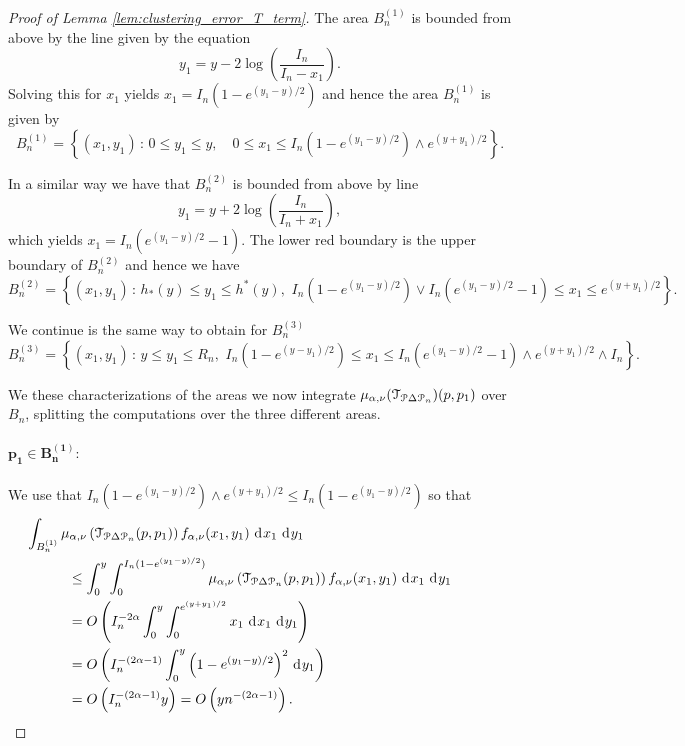 \begin{proof}[Proof of Lemma \ref{lem:clustering_error_T_term}]
The area $B_n^{(1)}$ is bounded from above by the line given by the equation
\[
	y_1 = y - 2\log\left(\frac{I_n}{I_n - x_1}\right).
\]
Solving this for $x_1$ yields $x_1 = I_n\left(1 - e^{(y_1-y)/2}\right)$ and hence the area $B_n^{(1)}$ is given by
\[
	B_n^{(1)} = \left\{(x_1, y_1) \, : \, 0 \le y_1 \le y, \quad 0 \le x_1 \le I_n\left(1 - e^{(y_1-y)/2}\right) \wedge e^{(y + y_1)/2} \right\}.
\]

In a similar way we have that $B_n^{(2)}$ is bounded from above by line
\[
	y_1 = y + 2\log\left(\frac{I_n}{I_n + x_1}\right),
\]
which yields $x_1 = I_n\left(e^{(y_1 - y)/2} - 1\right)$. The lower red boundary is the upper boundary of $B_n^{(2)}$ and hence we have
\[
	B_n^{(2)} = \left\{(x_1, y_1) \, : \, h_\ast(y) \le y_1 \le h^\ast(y), \,\, I_n\left(1 - e^{(y_1-y)/2}\right) \vee 
	I_n\left(e^{(y_1 - y)/2} - 1\right) \le x_1 \le e^{(y + y_1)/2} \right\}.
\]

We continue is the same way to obtain for $B_n^{(3)}$
\[
	B_n^{(3)} = \left\{(x_1, y_1) \, : \, y \le y_1 \le R_n, \,\,
	I_n\left(1 - e^{(y - y_1)/2}\right) \le x_1 \le I_n\left(e^{(y_1 - y)/2} - 1\right) \wedge e^{(y + y_1)/2} \wedge I_n \right\}.
\]

We these characterizations of the areas we now integrate $\mu_{\alpha, \nu}(\mathcal{T}_{{\mathcal P} \Delta {\mathcal P}_n})(p,p_1)$ over $B_n$, splitting the computations over the three different areas.

\paragraph{$\bm{p_1 \in B_n^{(1)}}:$}

We use that $I_n\left(1 - e^{(y_1-y)/2}\right) \wedge e^{(y + y_1)/2} \le I_n\left(1 - e^{(y_1-y)/2}\right)$ so that
\begin{align*}
	&\hspace{-30pt}\int_{B_n^{(1)}} \mu_{\alpha, \nu}\left(\mathcal{T}_{\Pcal \Delta \Pcal_n}(p,p_1)\right) 
		f_{\alpha,\nu}(x_1,y_1)	\dd x_1 \dd y_1 \\
	&\le  \int_0^y \int_0^{I_n(1-e^{(y_1-y)/2})} \mu_{\alpha, \nu}\left(\mathcal{T}_{\Pcal \Delta \Pcal_n}(p,p_1)\right) 
		f_{\alpha,\nu}(x_1,y_1) \dd x_1 \dd y_1\\
	&= \bigO{ I_n^{-2\alpha} \int_0^y \int_0^{e^{(y+y_1)/2}}  x_1 \dd x_1 \dd y_1 }\\
	&= \bigO{I_n^{-(2\alpha-1)} \int_0^y \left(1 - e^{(y_1-y)/2}\right)^2 \dd y_1} \\
	&= \bigO{I_n^{-(2\alpha - 1)} y} = \bigO{y n^{-(2\alpha - 1)}}.
\end{align*} 


\end{proof}
